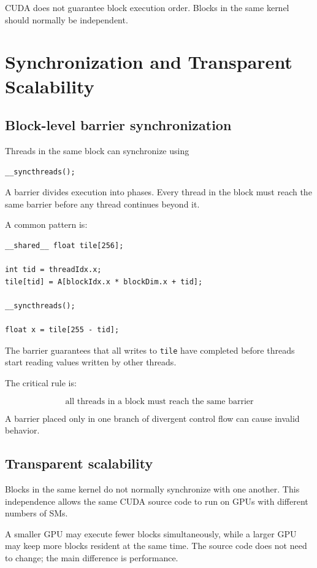 \documentclass[11pt,a4paper]{article}
\begin{document}
CUDA does not guarantee block execution order. Blocks in the same kernel should normally be independent.

\section{Synchronization and Transparent Scalability}

\subsection{Block-level barrier synchronization}

Threads in the same block can synchronize using

\begin{lstlisting}
__syncthreads();
\end{lstlisting}

A barrier divides execution into phases. Every thread in the block must reach the same barrier before any thread continues beyond it.

A common pattern is:

\begin{lstlisting}
__shared__ float tile[256];

int tid = threadIdx.x;
tile[tid] = A[blockIdx.x * blockDim.x + tid];

__syncthreads();

float x = tile[255 - tid];
\end{lstlisting}

The barrier guarantees that all writes to \texttt{tile} have completed before threads start reading values written by other threads.

The critical rule is:

\[
\boxed{
\text{all threads in a block must reach the same barrier}
}
\]

A barrier placed only in one branch of divergent control flow can cause invalid behavior.

\subsection{Transparent scalability}

Blocks in the same kernel do not normally synchronize with one another. This independence allows the same CUDA source code to run on GPUs with different numbers of SMs.

A smaller GPU may execute fewer blocks simultaneously, while a larger GPU may keep more blocks resident at the same time. The source code does not need to change; the main difference is performance.
\end{document}
